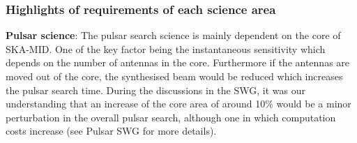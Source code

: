 \documentclass[sfheadings,a4paper,times,9pt,floats,floatfix]{article}
\begin{document}
\subsubsection{Highlights of requirements of each science area}

{\bf Pulsar science}: The pulsar search science is mainly dependent on
the core of SKA-MID. One of the key factor being the
instantaneous sensitivity which depends on the number of antennas in the core.
Furthermore if the antennas are moved out of the core, the synthesised beam would be
reduced which increases the pulsar search time. During the discussions in the SWG, it was
our understanding that an increase of the core area of around 10\% would be a minor
perturbation in the overall pulsar search, although one in which
computation costs increase (see Pulsar SWG for more details).
\end{document}
